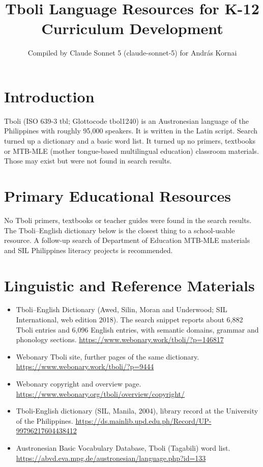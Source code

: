 \documentclass[12pt]{article}
\title{Tboli Language Resources for K-12 Curriculum Development}
\author{Compiled by Claude Sonnet 5 (claude-sonnet-5) for Andr\'as Kornai}
\date{}
\begin{document}
\maketitle

\section{Introduction}
Tboli (ISO 639-3 tbl; Glottocode tbol1240) is an Austronesian language of the Philippines with roughly 95,000 speakers. It is written in the Latin script. Search turned up a dictionary and a basic word list. It turned up no primers, textbooks or MTB-MLE (mother tongue-based multilingual education) classroom materials. Those may exist but were not found in search results.

\section{Primary Educational Resources}
No Tboli primers, textbooks or teacher guides were found in the search results. The Tboli--English dictionary below is the closest thing to a school-usable resource. A follow-up search of Department of Education MTB-MLE materials and SIL Philippines literacy projects is recommended.

\section{Linguistic and Reference Materials}
\begin{itemize}
\item Tboli--English Dictionary (Awed, Silin, Moran and Underwood; SIL International, web edition 2018). The search snippet reports about 6,882 Tboli entries and 6,096 English entries, with semantic domains, grammar and phonology sections. \url{https://www.webonary.work/tboli/?p=146817}
\item Webonary Tboli site, further pages of the same dictionary. \url{https://www.webonary.work/tboli/?p=9444}
\item Webonary copyright and overview page. \url{https://www.webonary.org/tboli/overview/copyright/}
\item Tboli-English dictionary (SIL, Manila, 2004), library record at the University of the Philippines. \url{https://ds.mainlib.upd.edu.ph/Record/UP-99796217604438412}
\item Austronesian Basic Vocabulary Database, Tboli (Tagabili) word list. \url{https://abvd.eva.mpg.de/austronesian/language.php?id=133}
\end{itemize}
\end{document}
